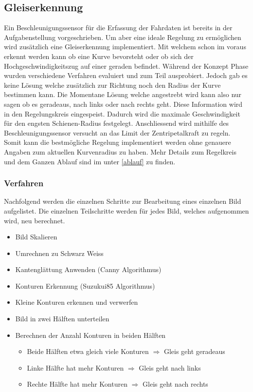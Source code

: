 \documentclass[../../main.tex]{subfiles}
\begin{document}
\subsection{Gleiserkennung}
Ein Beschleunigungssensor für die Erfassung der Fahrdaten ist bereits in der Aufgabenstellung vorgeschrieben.
Um aber eine ideale Regelung zu ermöglichen wird zusätzlich eine Gleiserkennung implementiert. Mit welchem schon im voraus
erkennt werden kann ob eine Kurve bevorsteht oder ob sich der Hochgeschwindigkeitszug auf einer geraden befindet.
Während der Konzept Phase wurden verschiedene Verfahren evaluiert und zum Teil ausprobiert. Jedoch gab es keine Lösung welche zusätzlich zur Richtung noch den Radius
der Kurve bestimmen kann. Die Momentane Lösung welche angestrebt wird kann also nur sagen ob es geradeaus, nach links oder nach rechts geht.
Diese Information wird in den Regelungskreis eingespeist. Dadurch wird die maximale Geschwindigkeit für den engsten Schienen-Radius festgelegt. Anschliessend wird mithilfe des Beschleunigungssensor versucht an das Limit der Zentripetalkraft zu regeln. Somit kann die
bestmögliche Regelung implementiert werden ohne genauere Angaben zum aktuellen Kurvenradius zu haben.
Mehr Details zum Regelkreis und dem Ganzen Ablauf sind im unter \ref{ablauf} zu finden.

\subsubsection{Verfahren}
Nachfolgend werden die einzelnen Schritte zur Bearbeitung eines einzelnen Bild aufgelistet.
Die einzelnen Teilschritte werden für jedes Bild, welches aufgenommen wird, neu berechnet.
\begin{itemize} %
    \item Bild Skalieren
    \item Umrechnen zu Schwarz Weiss
    \item Kantenglättung Anwenden (Canny Algorithmus)
    \item Konturen Erkennung (Suzukui85 Algorithmus)
    \item Kleine Konturen erkennen und verwerfen
    \item Bild in zwei Hälften unterteilen
    \item Berechnen der Anzahl Konturen in beiden Hälften
        \begin{itemize}
            \item Beide Hälften etwa gleich viele Konturen $\Rightarrow$ Gleis geht geradeaus
            \item Linke Hälfte hat mehr Konturen $\Rightarrow$ Gleis geht nach links
            \item Rechte Hälfte hat mehr Konturen $\Rightarrow$ Gleis geht nach rechts
        \end{itemize}
\end{itemize}
\end{document}
